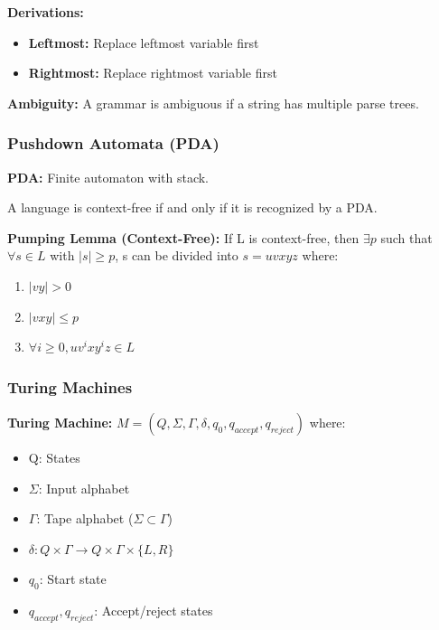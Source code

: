 \documentclass[11pt,a4paper]{article}
\begin{document}
\textbf{Derivations:}
\begin{itemize}
    \item \textbf{Leftmost:} Replace leftmost variable first
    \item \textbf{Rightmost:} Replace rightmost variable first
\end{itemize}

\begin{defbox}
\textbf{Ambiguity:} A grammar is ambiguous if a string has multiple parse trees.
\end{defbox}

\subsubsection{Pushdown Automata (PDA)}

\begin{defbox}
\textbf{PDA:} Finite automaton with stack.
\end{defbox}

\begin{thmbox}
A language is context-free if and only if it is recognized by a PDA.
\end{thmbox}

\begin{thmbox}
\textbf{Pumping Lemma (Context-Free):} If L is context-free, then $\exists p$ such that $\forall s \in L$ with $|s| \geq p$, s can be divided into $s = uvxyz$ where:
\begin{enumerate}
    \item $|vy| > 0$
    \item $|vxy| \leq p$
    \item $\forall i \geq 0, uv^ixy^iz \in L$
\end{enumerate}
\end{thmbox}

\subsubsection{Turing Machines}

\begin{defbox}
\textbf{Turing Machine:} $M = (Q, \Sigma, \Gamma, \delta, q_0, q_{accept}, q_{reject})$ where:
\begin{itemize}
    \item Q: States
    \item $\Sigma$: Input alphabet
    \item $\Gamma$: Tape alphabet ($\Sigma \subset \Gamma$)
    \item $\delta: Q \times \Gamma \rightarrow Q \times \Gamma \times \{L, R\}$
    \item $q_0$: Start state
    \item $q_{accept}, q_{reject}$: Accept/reject states
\end{itemize}
\end{defbox}
\end{document}
